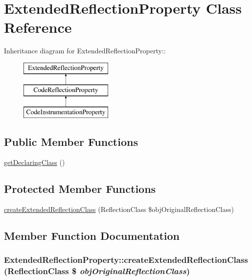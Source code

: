 \hypertarget{class_extended_reflection_property}{
\section{ExtendedReflectionProperty Class Reference}
\label{class_extended_reflection_property}
}
Inheritance diagram for ExtendedReflectionProperty::\begin{figure}[H]
\begin{center}
\leavevmode
\includegraphics[height=3cm]{class_extended_reflection_property}
\end{center}
\end{figure}
\subsection*{Public Member Functions}
\begin{CompactItemize}
\item 
\hyperlink{class_extended_reflection_property_af1e7fdb7af7548692400dcad6c85c65}{getDeclaringClass} ()
\end{CompactItemize}
\subsection*{Protected Member Functions}
\begin{CompactItemize}
\item 
\hyperlink{class_extended_reflection_property_05c178f6fef194d390db8312f9595d93}{createExtendedReflectionClass} (ReflectionClass \$objOriginalReflectionClass)
\end{CompactItemize}


\subsection{Member Function Documentation}
\hypertarget{class_extended_reflection_property_05c178f6fef194d390db8312f9595d93}{
\subsubsection[{createExtendedReflectionClass}]{\setlength{\rightskip}{0pt plus 5cm}ExtendedReflectionProperty::createExtendedReflectionClass (ReflectionClass \$ {\em objOriginalReflectionClass})}}
\label{class_extended_reflection_property_05c178f6fef194d390db8312f9595d93}


